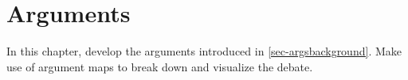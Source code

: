 \chapter{Arguments}
\label{chap-arguments}

In this chapter, develop the arguments introduced in \ref{sec-argsbackground}. Make use of argument maps to break down
and visualize the debate.
